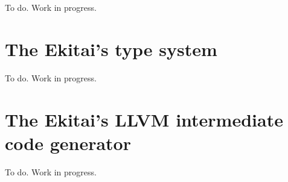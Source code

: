 \documentclass[
  oneside,
  english,
  coorientadorbanca,
  embeddedlogo,
  noabntexcite
]{ufsc-thesis-rn46-2019}
\begin{document}
To do. Work in progress.

\section{The Ekitai's type system}

To do. Work in progress.

\section{The Ekitai's LLVM intermediate code generator}

To do. Work in progress.


\postextual{}
\printbibliography{}
\end{document}
